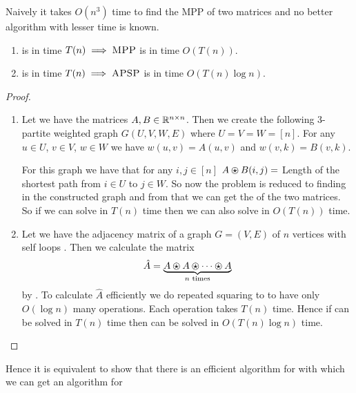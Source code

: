 \begin{algoprob}
\end{algoprob}
Naively it takes $O(n^3)$ time to find the MPP of two matrices and no better algorithm with lesser time is known.
\begin{theorem}{}{}
	\begin{enumerate}
		\item {} is in time $T(n)\implies\textsc{MPP}$ is in time $O(T(n))$.
		\item {} is in time $T(n)\implies \textsc{APSP}$ is in time $O(T(n)\log n)$.
	\end{enumerate}
\end{theorem}
\begin{proof}
	\begin{enumerate}
		\item Let we have the matrices $A,B\in\mathbb{R}^{n\times n}$. Then we create the following 3-partite weighted graph $G(U,V,W,E)$ where $U=V=W=[n]$. For any $u\in U$, $v\in V$, $w\in W$ we have $w(u,v)=A(u,v)$ and $w(v,k)=B(v,k)$. \parinn
		
		For this graph we have that for any $i,j\in[n]$ $A\ostar B(i,j)=$ Length of the shortest path from $i\in U$ to $j\in W$. So now the problem is reduced to finding  in the constructed graph and from that we can get the  of the two matrices. So if we can solve  in $T(n)$ time then we can also solve  in $O(T(n))$ time.
		\item Let we have the adjacency matrix of a graph $G=(V,E)$ of $n$ vertices with self loops . Then we calculate the matrix $$\hat{A}=\underbrace{A\ostar A\ostar \cdots \ostar A}_{n\text{ times}}$$by . To calculate $\hat{A}$ efficiently we do repeated squaring to to have only $O(\log n)$ many  operations. Each operation takes $T(n)$ time. Hence if  can be solved in $T(n)$ time then  can be solved in $O(T(n)\log n)$ time.
	\end{enumerate}
\end{proof}
Hence it is equivalent to show that there is an efficient algorithm for  with which we can get an algorithm for 

